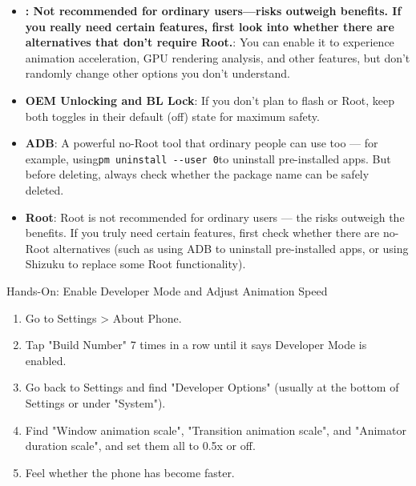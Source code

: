 \begin{itemize}
  \item \textbf{: Not recommended for ordinary users—risks outweigh benefits. If you really need certain features, first look into whether there are alternatives that don't require Root.}: You can enable it to experience animation acceleration, GPU rendering analysis, and other features, but don't randomly change other options you don't understand.
  \item \textbf{OEM Unlocking and BL Lock}: If you don't plan to flash or Root, keep both toggles in their default (off) state for maximum safety.
  \item \textbf{ADB}: A powerful no-Root tool that ordinary people can use too — for example, using\texttt{pm uninstall -\allowbreak -\allowbreak user 0}to uninstall pre-installed apps. But before deleting, always check whether the package name can be safely deleted.
  \item \textbf{Root}: Root is not recommended for ordinary users — the risks outweigh the benefits. If you truly need certain features, first check whether there are no-Root alternatives (such as using ADB to uninstall pre-installed apps, or using Shizuku to replace some Root functionality).
\end{itemize}

\begin{tcbpractice}{Hands-On: Enable Developer Mode and Adjust Animation Speed}
\begin{enumerate}
  \item Go to Settings > About Phone.
  \item Tap "Build Number" 7 times in a row until it says Developer Mode is enabled.
  \item Go back to Settings and find "Developer Options" (usually at the bottom of Settings or under "System").
  \item Find "Window animation scale", "Transition animation scale", and "Animator duration scale", and set them all to 0.5x or off.
  \item Feel whether the phone has become faster.
\end{enumerate}

\end{tcbpractice}
